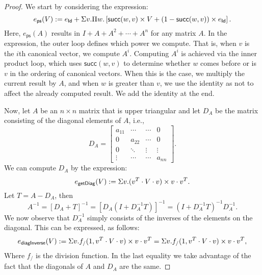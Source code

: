 \begin{proof} We start by considering the expression:
$$
e_{\mathsf{ps}}(V):= e_{\mathsf{Id}} + \Sigma v.\Pi w. \left[ \mathsf{succ}(w,v)\times V + (1 - \mathsf{succ}(w,v))\times e_{\mathsf{Id}} \right].
$$
Here, $e_{\mathsf{ps}}(A)$ results in $I+A+A^2+\cdots + A^n$ for any matrix $A$. In the expression, the outer loop defines which power we compute. 
That is, when $v$ is the $i$th canonical vector, we compute $A^i$.
Computing $A^i$ is achieved via the inner product loop, which uses $\mathsf{succ}(w,v)$ to 
determine whether $w$ comes before or is $v$ in the ordering of canonical vectors.
When this is the case, we multiply the current result by $A$, and when $w$ is greater 
than $v$, we use the identity as not to affect the already computed result. We add the identity at the end.

Now, let $A$ be an $n\times n$ matrix that is upper triangular and let $D_A$ be the matrix consisting of the diagonal elements of $A$, i.e.,
\[
D_A = \begin{bmatrix}
    a_{11} & \cdots & \cdots &  0 \\
    0 & a_{22} & \cdots &  0 \\
    0 & \ddots & \vdots & \vdots \\
    \vdots & \cdots& \cdots & a_{nn}
\end{bmatrix}.
\]
We can compute $D_A$ by the expression:
$$
e_{\mathsf{getDiag}}(V) := \Sigma v. (v^T\cdot V\cdot v) \times v\cdot v^T.
$$
Let $T=A-D_A$, then
$$
A^{-1}=\left[ D_A+T \right]^{-1}= \left[ D_A\left( I+D_A^{-1}T\right) \right]^{-1} = \left( I+D_A^{-1}T\right)^{-1}D_A^{-1}.
$$
We now observe that $D_{A}^{-1}$ simply consists of the inverses of the elements on the diagonal. This can be expressed, as follows:
$$
e_{\mathsf{diagInverse}}(V):=\Sigma v. f_{/}(1,v^T\cdot V\cdot v)\times v\cdot v^T=\Sigma v. f_{/}(1,v^T\cdot V\cdot v)\times v\cdot v^T,
$$
Where $f_{/}$ is the division function. In the last equality we take advantage of the fact that the diagonals of $A$ and $D_A$ are the same.


\end{proof}
